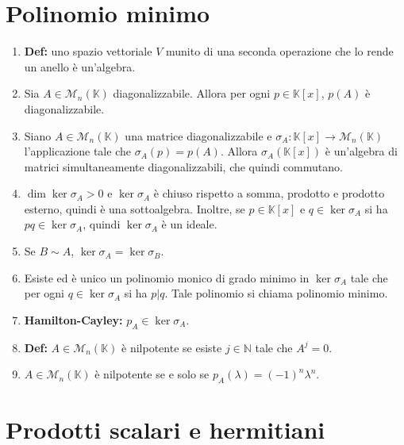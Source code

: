 \documentclass[a4paper,11pt]{article}
\begin{document}
\section{Polinomio minimo}
\begin{enumerate}[resume]
	\item\textbf{Def:} uno spazio vettoriale $V$ munito di una seconda operazione che lo rende un anello è un'algebra.
	\item Sia $A\in\mathcal{M}_n(\mathbb{K})$ diagonalizzabile. Allora per ogni $p\in\mathbb{K}[x]$, $p(A)$ è diagonalizzabile.
	\item Siano $A\in\mathcal{M}_n(\mathbb{K})$ una matrice diagonalizzabile e $\sigma_A\colon\mathbb{K}[x]\to\mathcal{M}_n(\mathbb{K})$ l'applicazione tale che $\sigma_A(p)=p(A)$. Allora $\sigma_A(\mathbb{K}[x])$ è un'algebra di matrici simultaneamente diagonalizzabili, che quindi commutano.
	\item $\dim\ker\sigma_A>0$ e $\ker\sigma_A$ è chiuso rispetto a somma, prodotto e prodotto esterno, quindi è una sottoalgebra. Inoltre, se $p\in\mathbb{K}[x]$ e $q\in\ker\sigma_A$ si ha $pq\in\ker\sigma_A$, quindi $\ker\sigma_A$ è un ideale.
	\item Se $B\sim A$, $\ker\sigma_A=\ker\sigma_B$.
	\item Esiste ed è unico un polinomio monico di grado minimo in $\ker\sigma_A$ tale che per ogni $q\in\ker\sigma_A$ si ha $p|q$. Tale polinomio si chiama polinomio minimo.
	\item\textbf{Hamilton-Cayley:} $p_A\in\ker\sigma_A$.
	\item\textbf{Def:} $A\in\mathcal{M}_n(\mathbb{K})$ è nilpotente se esiste $j\in\mathbb{N}$ tale che $A^j=0$.
	\item $A\in\mathcal{M}_n(\mathbb{K})$ è nilpotente se e solo se $p_A(\lambda)=(-1)^n\lambda^n$.
\end{enumerate}
\section{Prodotti scalari e hermitiani}
\end{document}
